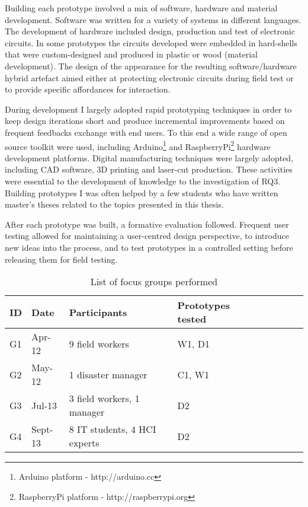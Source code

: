 Building each prototype involved a mix of software, hardware and material development. Software was written for a variety of systems in different languages. The development of hardware included design, production and test of electronic circuits. In some prototypes the circuits developed were embedded in hard-shells that were custom-designed and produced in plastic or wood (material development). The design of the appearance for the resulting software/hardware hybrid artefact aimed either at protecting electronic circuits during field test or to provide specific affordances for interaction.

During development I largely adopted rapid prototyping techniques in order to keep design iterations short and produce incremental improvements based on frequent feedbacks exchange with end users. To this end a wide range of open source toolkit were used, including Arduino\footnote{Arduino platform - http://arduino.cc} and RaspberryPi\footnote{RaspberryPi platform - http://raspberrypi.org} hardware development platforms. Digital manufacturing techniques were largely adopted, including CAD software, 3D printing and laser-cut production. These activities were essential to the development of knowledge to the investigation of RQ3. Building prototypes I was often helped by a few students who have written master's theses related to the topics presented in this thesis.

After each prototype was built, a formative evaluation followed. Frequent user testing allowed for maintaining a user-centred design perspective, to introduce new ideas into the process, and to test prototypes in a controlled setting before releasing them for field testing.

\begin{table}
	[h] \centering \caption{List of focus groups performed} \label{labtests} 
	\begin{tabular}
		{@{}lllllllll@{}} \toprule 
		ID & Date & Participants & Prototypes tested \\
		\midrule 
		G1 & Apr-12 & 9 field workers & W1, D1 \\
		G2 & May-12 & 1 disaster manager & C1, W1 \\
		G3 & Jul-13 & 3 field workers, 1 manager & D2 \\
		G4 & Sept-13 & 8 IT students, 4 HCI experts & D2 \\
		\bottomrule 
	\end{tabular}
\end{table}

